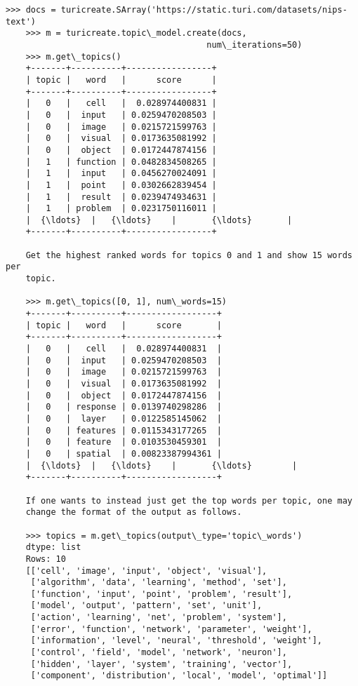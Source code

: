 \documentclass[11pt]{ctexart}
\begin{document}
\begin{Verbatim}[commandchars=\\\{\}]
    >>> docs = turicreate.SArray('https://static.turi.com/datasets/nips-text')
    >>> m = turicreate.topic\_model.create(docs,
                                        num\_iterations=50)
    >>> m.get\_topics()
    +-------+----------+-----------------+
    | topic |   word   |      score      |
    +-------+----------+-----------------+
    |   0   |   cell   |  0.028974400831 |
    |   0   |  input   | 0.0259470208503 |
    |   0   |  image   | 0.0215721599763 |
    |   0   |  visual  | 0.0173635081992 |
    |   0   |  object  | 0.0172447874156 |
    |   1   | function | 0.0482834508265 |
    |   1   |  input   | 0.0456270024091 |
    |   1   |  point   | 0.0302662839454 |
    |   1   |  result  | 0.0239474934631 |
    |   1   | problem  | 0.0231750116011 |
    |  {\ldots}  |   {\ldots}    |       {\ldots}       |
    +-------+----------+-----------------+
    
    Get the highest ranked words for topics 0 and 1 and show 15 words per
    topic.
    
    >>> m.get\_topics([0, 1], num\_words=15)
    +-------+----------+------------------+
    | topic |   word   |      score       |
    +-------+----------+------------------+
    |   0   |   cell   |  0.028974400831  |
    |   0   |  input   | 0.0259470208503  |
    |   0   |  image   | 0.0215721599763  |
    |   0   |  visual  | 0.0173635081992  |
    |   0   |  object  | 0.0172447874156  |
    |   0   | response | 0.0139740298286  |
    |   0   |  layer   | 0.0122585145062  |
    |   0   | features | 0.0115343177265  |
    |   0   | feature  | 0.0103530459301  |
    |   0   | spatial  | 0.00823387994361 |
    |  {\ldots}  |   {\ldots}    |       {\ldots}        |
    +-------+----------+------------------+
    
    If one wants to instead just get the top words per topic, one may
    change the format of the output as follows.
    
    >>> topics = m.get\_topics(output\_type='topic\_words')
    dtype: list
    Rows: 10
    [['cell', 'image', 'input', 'object', 'visual'],
     ['algorithm', 'data', 'learning', 'method', 'set'],
     ['function', 'input', 'point', 'problem', 'result'],
     ['model', 'output', 'pattern', 'set', 'unit'],
     ['action', 'learning', 'net', 'problem', 'system'],
     ['error', 'function', 'network', 'parameter', 'weight'],
     ['information', 'level', 'neural', 'threshold', 'weight'],
     ['control', 'field', 'model', 'network', 'neuron'],
     ['hidden', 'layer', 'system', 'training', 'vector'],
     ['component', 'distribution', 'local', 'model', 'optimal']]


    \end{Verbatim}
\end{document}

